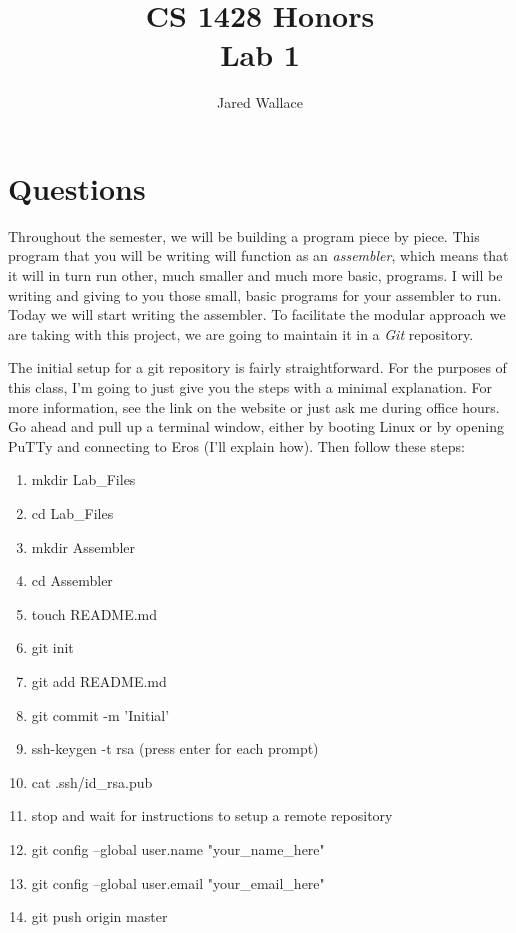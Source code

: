 \documentclass[letterpaper,12pt]{article}
\title{\Large CS 1428 Honors\\Lab 1}
\author{Jared Wallace}
\date{}
\begin{document}
\maketitle

\vspace{30mm}

\section*{Questions}
Throughout the semester, we will be building a program piece by piece.
This program that you will be writing will function as an \emph{assembler},
which means that it will in turn run other, much smaller and much more basic, programs.
I will be writing and giving to you those small, basic programs for your assembler to run.
Today we will start writing the assembler. To facilitate the modular approach we are taking with
this project, we are going to maintain it in a \emph{Git} repository.

The initial setup for a git repository is fairly straightforward. For the purposes of this class,
I'm going to just give you the steps with a minimal explanation. For more information, see the link
on the website or just ask me during office hours. Go ahead and pull up a terminal window, either by
booting Linux or by opening PuTTy and connecting to Eros (I'll explain how). Then follow these steps:
\begin{enumerate}
    \item mkdir Lab\_Files
    \item cd Lab\_Files
    \item mkdir Assembler
    \item cd Assembler
    \item touch README.md
    \item git init
    \item git add README.md
    \item git commit -m 'Initial'
    \item ssh-keygen -t rsa (press enter for each prompt)
    \item cat .ssh/id\_rsa.pub
    \item stop and wait for instructions to setup a remote repository
    \item git config --global user.name "your\_name\_here"
    \item git config --global user.email "your\_email\_here"
    \item git push origin master
\end{enumerate}
\end{document}
